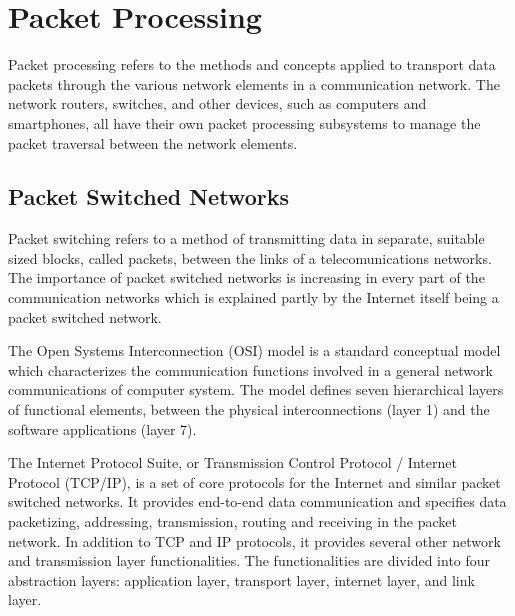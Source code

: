 \section{Packet Processing}
\label{sec:packet-processing}

Packet processing refers to the methods and concepts applied to transport data packets through the various network elements in a communication network. The network routers, switches, and other devices, such as computers and smartphones, all have their own packet processing subsystems to manage the packet traversal between the network elements.  

\subsection{Packet Switched Networks}
Packet switching refers to a method of transmitting data in separate, suitable sized blocks, called packets, between the links of a telecomunications networks. The importance of packet switched networks is increasing in every part of the communication networks which is explained partly by the Internet itself being a packet switched network.

The Open Systems Interconnection (OSI) model is a standard conceptual model which characterizes the communication functions involved in a general network communications of computer system. The model defines seven hierarchical layers of functional elements, between the physical interconnections (layer 1) and the software applications (layer 7).~\cite{ISO:1994:OSI}

The Internet Protocol Suite, or Transmission Control Protocol / Internet Protocol (TCP/IP), is a set of core protocols for the Internet and similar packet switched networks. It provides end-to-end data communication and specifies data packetizing, addressing, transmission, routing and receiving in the packet network. In addition to TCP and IP protocols, it provides several other network and transmission layer functionalities. The functionalities are divided into four abstraction layers: application layer, transport layer, internet layer, and link layer.

